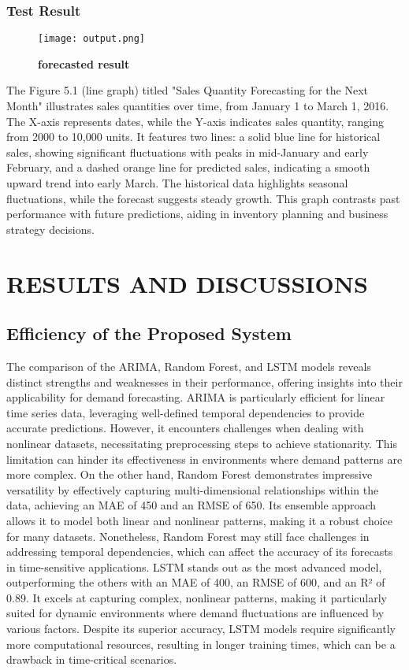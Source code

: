 \documentclass[10pt]{report}
\begin{document}
\begin{center}
\subsection{Test Result}
\begin{figure}[H]
 \centering
 \texttt{[image: output.png]}
 \caption{\textbf{forecasted result}}
\end{figure}
The Figure 5.1 (line graph) titled "Sales Quantity Forecasting for the Next Month" illustrates sales quantities over time, from January 1 to March 1, 2016. The X-axis represents dates, while the Y-axis indicates sales quantity, ranging from 2000 to 10,000 units. It features two lines: a solid blue line for historical sales, showing significant fluctuations with peaks in mid-January and early February, and a dashed orange line for predicted sales, indicating a smooth upward trend into early March. The historical data highlights seasonal fluctuations, while the forecast suggests steady growth. This graph contrasts past performance with future predictions, aiding in inventory planning and business strategy decisions.

\chapter{RESULTS AND DISCUSSIONS}
\linespread{1.5}
\section{Efficiency of the Proposed System}
The comparison of the ARIMA, Random Forest, and LSTM models reveals distinct strengths and weaknesses in their performance, offering insights into their applicability for demand forecasting. ARIMA is particularly efficient for linear time series data, leveraging well-defined temporal dependencies to provide accurate predictions. However, it encounters challenges when dealing with nonlinear datasets, necessitating preprocessing steps to achieve stationarity. This limitation can hinder its effectiveness in environments where demand patterns are more complex. On the other hand, Random Forest demonstrates impressive versatility by effectively capturing multi-dimensional relationships within the data, achieving an MAE of 450 and an RMSE of 650. Its ensemble approach allows it to model both linear and nonlinear patterns, making it a robust choice for many datasets. Nonetheless, Random Forest may still face challenges in addressing temporal dependencies, which can affect the accuracy of its forecasts in time-sensitive applications. LSTM stands out as the most advanced model, outperforming the others with an MAE of 400, an RMSE of 600, and an R² of 0.89. It excels at capturing complex, nonlinear patterns, making it particularly suited for dynamic environments where demand fluctuations are influenced by various factors. Despite its superior accuracy, LSTM models require significantly more computational resources, resulting in longer training times, which can be a drawback in time-critical scenarios.\\


\end{center}
\end{document}
